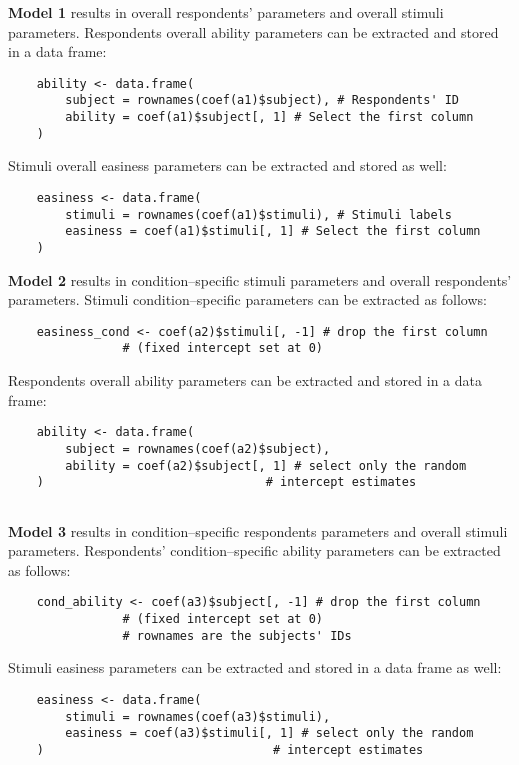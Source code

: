 \documentclass[12pt]{book}
\begin{document}
\textbf{Model 1} results in overall respondents' parameters and overall stimuli parameters. Respondents overall ability parameters can be extracted and stored in a data frame: 
%
\begin{lstlisting}
	ability <- data.frame(
		subject = rownames(coef(a1)$subject), # Respondents' ID
		ability = coef(a1)$subject[, 1] # Select the first column
	)		
\end{lstlisting}

Stimuli overall easiness parameters can be extracted and stored as well: 
%
\begin{lstlisting}
	easiness <- data.frame(
		stimuli = rownames(coef(a1)$stimuli), # Stimuli labels
		easiness = coef(a1)$stimuli[, 1] # Select the first column
	)
\end{lstlisting}


\textbf{Model 2} results in condition--specific stimuli parameters and overall respondents' parameters. 
Stimuli condition--specific parameters can be extracted as follows: 
%
\begin{lstlisting}
	easiness_cond <- coef(a2)$stimuli[, -1] # drop the first column 
				# (fixed intercept set at 0)
\end{lstlisting}

Respondents overall ability parameters can be extracted and stored in a data frame: 
%
\begin{lstlisting}
	ability <- data.frame(
		subject = rownames(coef(a2)$subject),
		ability = coef(a2)$subject[, 1] # select only the random 
	)                               # intercept estimates
	
\end{lstlisting}

\textbf{Model 3} results in condition--specific respondents parameters and overall stimuli parameters. Respondents' condition--specific ability parameters can be extracted as follows: 
%
\begin{lstlisting}
	cond_ability <- coef(a3)$subject[, -1] # drop the first column 
				# (fixed intercept set at 0)
				# rownames are the subjects' IDs
\end{lstlisting}

Stimuli easiness parameters can be extracted and stored in a data frame as well: 
%
\begin{lstlisting}
	easiness <- data.frame(
		stimuli = rownames(coef(a3)$stimuli),
		easiness = coef(a3)$stimuli[, 1] # select only the random 
	)                                # intercept estimates
	
\end{lstlisting}
\end{document}
